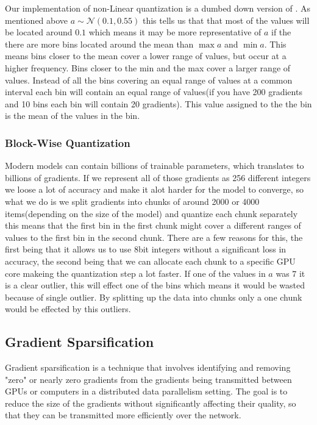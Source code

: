\documentclass[twocolumn,10pt]{article}
\begin{document}
Our implementation of non-Linear quantization is a dumbed down version of \cite{dettmers20218}. As mentioned above $a \sim \mathcal{N}(0.1,0.55)$ this tells us that that most of the values will be located around $0.1$ which means it may be more representative of $a$ if the there are more bins located around the mean than $\max a$ and $\min a$. This means bins closer to the mean cover a lower range of values, but occur at a higher frequency. Bins closer to the min and the max cover a larger range of values. Instead of all the bins covering an equal range of values at a common interval each bin will contain an equal range of values(if you have 200 gradients and 10 bins each bin will contain 20 gradients). This value assigned to the the bin is the mean of the values in the bin.

\subsubsection{Block-Wise Quantization}

Modern models can contain billions of trainable parameters, which translates to billions of gradients. If we represent all of those gradients as 256 different integers we loose a lot of accuracy and make it alot harder for the model to converge, so what we do is we split gradients into chunks of around 2000 or 4000 items(depending on the size of the model) and quantize each chunk separately this means that the first bin in the first chunk might cover a different ranges of values to the first bin in the second chunk. There are a few reasons for this, the first being that it allows us to use 8bit integers without a significant loss in accuracy, the second being that we can allocate each chunk to a specific GPU core makeing the quantization step a lot faster. If one of the values in $a$ was $7$ it is a clear outlier, this will effect one of the bins which means it would be wasted because of single outlier. By splitting up the data into chunks only a one chunk would be effected by this outliers.


\subsection{Gradient Sparsification}
Gradient sparsification is a technique that involves identifying and removing "zero" or nearly zero gradients \cite{NEURIPS2018_3328bdf9} from the gradients being transmitted between GPUs or computers in a distributed data parallelism setting. The goal is to reduce the size of the gradients without significantly affecting their quality, so that they can be transmitted more efficiently over the network.
\end{document}
